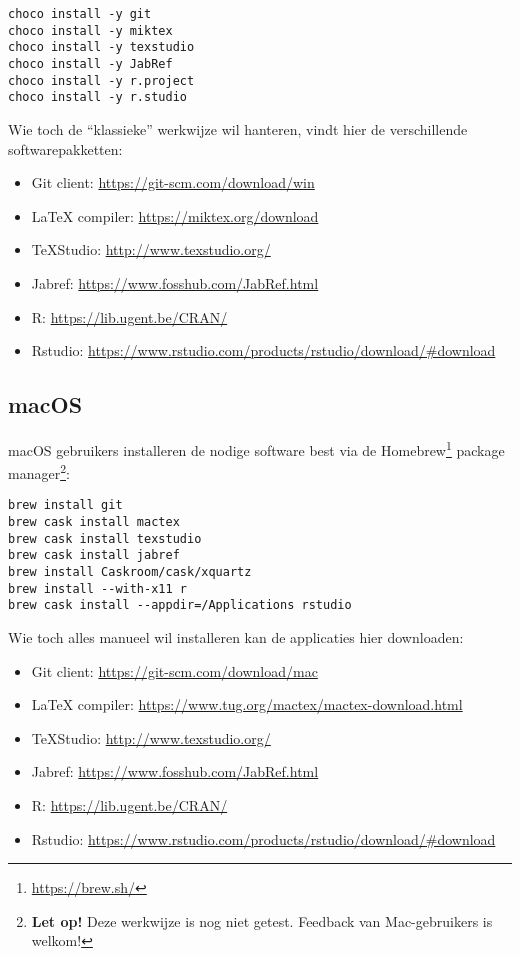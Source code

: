 \begin{verbatim}
choco install -y git
choco install -y miktex
choco install -y texstudio
choco install -y JabRef
choco install -y r.project
choco install -y r.studio
\end{verbatim}

Wie toch de ``klassieke'' werkwijze wil hanteren, vindt hier de verschillende softwarepakketten:

\begin{itemize}
  \item Git client: \url{https://git-scm.com/download/win}
  \item \LaTeX{} compiler: \url{https://miktex.org/download}
  \item TeXStudio: \url{http://www.texstudio.org/}
  \item Jabref: \url{https://www.fosshub.com/JabRef.html}
  \item R: \url{https://lib.ugent.be/CRAN/}
  \item Rstudio: \url{https://www.rstudio.com/products/rstudio/download/#download}
\end{itemize}

\subsection{macOS}

macOS gebruikers installeren de nodige software best via de Homebrew\footnote{\url{https://brew.sh/}} package manager\footnote{\textbf{Let op!} Deze werkwijze is nog niet getest. Feedback van Mac-gebruikers is welkom!}:

\begin{verbatim}
brew install git
brew cask install mactex
brew cask install texstudio
brew cask install jabref
brew install Caskroom/cask/xquartz
brew install --with-x11 r
brew cask install --appdir=/Applications rstudio
\end{verbatim}

Wie toch alles manueel wil installeren kan de applicaties hier downloaden:

\begin{itemize}
  \item Git client: \url{https://git-scm.com/download/mac}
  \item \LaTeX{} compiler: \url{https://www.tug.org/mactex/mactex-download.html}
  \item TeXStudio: \url{http://www.texstudio.org/}
  \item Jabref: \url{https://www.fosshub.com/JabRef.html}
  \item R: \url{https://lib.ugent.be/CRAN/}
  \item Rstudio: \url{https://www.rstudio.com/products/rstudio/download/#download}
\end{itemize}

